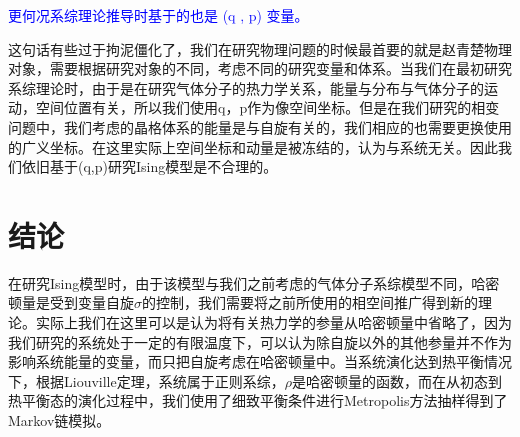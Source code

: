 \documentclass{article}
\begin{document}
\textcolor{blue}{更何况系综理论推导时基于的也是 (q , p) 变量。}


这句话有些过于拘泥僵化了，我们在研究物理问题的时候最首要的就是赵青楚物理对象，需要根据研究对象的不同，考虑不同的研究变量和体系。当我们在最初研究系综理论时，由于是在研究气体分子的热力学关系，能量与分布与气体分子的运动，空间位置有关，所以我们使用q，p作为像空间坐标。但是在我们研究的相变问题中，我们考虑的晶格体系的能量是与自旋有关的，我们相应的也需要更换使用的广义坐标。在这里实际上空间坐标和动量是被冻结的，认为与系统无关。因此我们依旧基于(q,p)研究Ising模型是不合理的。
	\section{结论}
	在研究Ising模型时，由于该模型与我们之前考虑的气体分子系综模型不同，哈密顿量是受到变量自旋$ \sigma $的控制，我们需要将之前所使用的相空间推广得到新的理论。实际上我们在这里可以是认为将有关热力学的参量从哈密顿量中省略了，因为我们研究的系统处于一定的有限温度下，可以认为除自旋以外的其他参量并不作为影响系统能量的变量，而只把自旋考虑在哈密顿量中。当系统演化达到热平衡情况下，根据Liouville定理，系统属于正则系综，$\rho$是哈密顿量的函数，而在从初态到热平衡态的演化过程中，我们使用了细致平衡条件进行Metropolis方法抽样得到了Markov链模拟。
\end{document}
